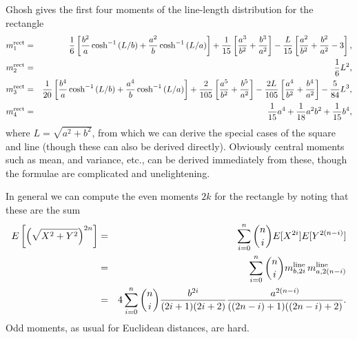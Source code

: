 Ghosh \cite{b.ghosh51:_random_rect} gives the first four moments of
the line-length distribution for the rectangle
\begin{eqnarray}
  \label{eq:rect_moments} 
  m^{\rm rect}_1 & = & \frac{1}{6} \left[ 
                        \frac{b^2}{a} \cosh^{-1}\left( L/b \right) +
                        \frac{a^2}{b} \cosh^{-1}\left( L/a \right) 
                 \right]
                  + \frac{1}{15} \left[ \frac{a^3}{b^2} + \frac{b^3}{a^2} \right]
                  - \frac{L}{15} \left[ \frac{a^2}{b^2} + \frac{b^2}{a^2} -3 \right],
\\
  m^{\rm rect}_2 & = & \frac{1}{6} L^2, \\
  m^{\rm rect}_3 & = & \frac{1}{20} \left[ 
                        \frac{b^4}{a} \cosh^{-1}\left( L/b \right) +
                        \frac{a^4}{b} \cosh^{-1}\left( L/a \right) 
                 \right]
                  + \frac{2}{105} \left[ \frac{a^5}{b^2} + \frac{b^5}{a^2} \right]
                  - \frac{2L}{105} \left[ \frac{a^4}{b^2} + \frac{b^4}{a^2}\right]
                        - \frac{5}{84} L^3, 
\\
  m^{\rm rect}_4 & = & \frac{1}{15} a^4 + \frac{1}{18} a^2 b^2 + \frac{1}{15} b^4,
  \label{eq:rect_moments_end} 
\end{eqnarray}
where $L = \sqrt{a^2 + b^2}$, from which we can derive the special
cases of the square and line (though these can also be derived
directly). Obviously central moments such as mean, and variance, etc.,
can be derived immediately from these, though the formulae are
complicated and unelightening.

In general we can compute the even moments $2k$ for the rectangle by
noting that these are the sum
\begin{eqnarray}
  E\left[ \left( \sqrt{ X^2 + Y^2} \right)^{2n} \right] 
   & = & \sum_{i=0}^{n} \dbinom{n}{i} E[X^{2i}] E[Y^{2(n-i)}]
   \nonumber \\
   & = & \sum_{i=0}^{n} \dbinom{n}{i} m^{\rm line}_{b, 2i} \, m^{\rm line}_{a, 2(n-i)}
   \nonumber \\
   & = & 4 \sum_{i=0}^{n} \dbinom{n}{i} 
            \frac{b^{2i}}{(2i+1)(2i+2)}
            \frac{a^{2(n-i)}}{((2n-i)+1)((2n-i)+2)} .
\end{eqnarray}
Odd moments, as usual for Euclidean distances, are hard.